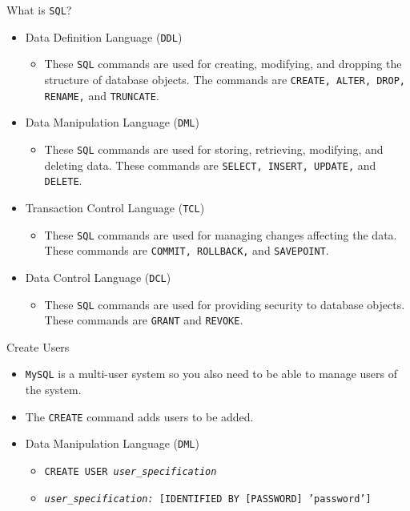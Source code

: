 \documentclass[xcolor=table,aspectratio=169]{beamer}
\begin{document}
\begin{frame}{What is \texttt{SQL}?}
  \begin{itemize}
    \item Data Definition Language (\texttt{DDL})
      \begin{itemize}
        \item These \texttt{SQL} commands are used for creating, modifying, and dropping the structure of database objects. The commands are \texttt{CREATE, ALTER, DROP, RENAME,} and \texttt{TRUNCATE}.
      \end{itemize}
    \item Data Manipulation Language (\texttt{DML})
      \begin{itemize}
        \item These \texttt{SQL} commands are used for storing, retrieving, modifying, and deleting data. These commands are \texttt{SELECT, INSERT, UPDATE,} and \texttt{DELETE}.
      \end{itemize}
    \item Transaction Control Language (\texttt{TCL})
      \begin{itemize}
        \item These \texttt{SQL} commands are used for managing changes affecting the data. These commands are \texttt{COMMIT, ROLLBACK,} and \texttt{SAVEPOINT}.
      \end{itemize}
    \item Data Control Language (\texttt{DCL})
      \begin{itemize}
        \item These \texttt{SQL} commands are used for providing security to database objects. These commands are \texttt{GRANT} and \texttt{REVOKE}.
      \end{itemize}
  \end{itemize}
\end{frame}

\begin{frame}{Create Users}
  \begin{itemize}
    \item \texttt{MySQL} is a multi-user system so you also need to be able to manage users of the system.
    \item The \texttt{CREATE} command adds users to be added.
    \item Data Manipulation Language (\texttt{DML})
      \begin{itemize}
        \item \texttt{CREATE USER \textit{user\_specification}}
        \item \texttt{\textit{user\_specification:} [IDENTIFIED BY [PASSWORD] 'password']} 
      \end{itemize}
  \end{itemize}
\end{frame}
\end{document}
